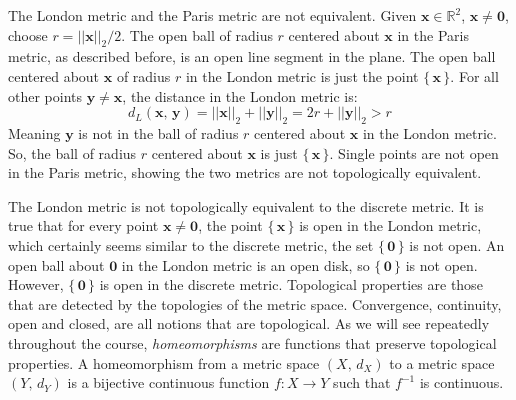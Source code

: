 \documentclass{article}
\theoremstyle{plain}
\theoremstyle{normal}
\newenvironment{example}{%
    \pushQED{\qed}\renewcommand{\qedsymbol}{$\blacksquare$}\examplex%
}{%
    \popQED\endexamplex%
}
\newenvironment{definition}{%
    \pushQED{\qed}\renewcommand{\qedsymbol}{$\blacksquare$}\definitionx%
}{%
    \popQED\enddefinitionx%
}
\begin{document}
        \begin{example}
            The London metric and the Paris metric are not equivalent. Given
            $\mathbf{x}\in\mathbb{R}^{2}$, $\mathbf{x}\ne\mathbf{0}$, choose
            $r=||\mathbf{x}||_{2}/2$. The open ball of radius $r$ centered about
            $\mathbf{x}$ in the Paris metric, as described before, is an open
            line segment in the plane. The open ball centered about
            $\mathbf{x}$ of radius $r$ in the London metric is just the
            point $\{\,\mathbf{x}\,\}$. For all other points
            $\mathbf{y}\ne\mathbf{x}$, the distance in the London metric is:
            \begin{equation}
                d_{L}(\mathbf{x},\,\mathbf{y})=
                    ||\mathbf{x}||_{2}+||\mathbf{y}||_{2}
                    =2r+||\mathbf{y}||_{2}>r
            \end{equation}
            Meaning $\mathbf{y}$ is not in the ball of radius $r$ centered about
            $\mathbf{x}$ in the London metric. So, the ball of radius $r$
            centered about $\mathbf{x}$ is just $\{\,\mathbf{x}\,\}$. Single
            points are not open in the Paris metric, showing the two metrics
            are not topologically equivalent.
        \end{example}
        \begin{example}
            The London metric is not topologically equivalent to the discrete
            metric. It is true that for every point $\mathbf{x}\ne\mathbf{0}$,
            the point $\{\,\mathbf{x}\,\}$ is open in the London metric, which
            certainly seems similar to the discrete metric, the set
            $\{\,\mathbf{0}\,\}$ is not open. An open ball about
            $\mathbf{0}$ in the London metric is an open disk, so
            $\{\,\mathbf{0}\,\}$ is not open. However, $\{\,\mathbf{0}\,\}$
            is open in the discrete metric.
        \end{example}
        Topological properties are those that are detected by the
        topologies of the metric space. Convergence, continuity, open and
        closed, are all notions that are topological. As we will see
        repeatedly throughout the course, \textit{homeomorphisms} are functions
        that preserve topological properties.
        \begin{definition}[\textbf{Homeomorphism}]
            A homeomorphism from a metric space $(X,\,d_{X})$ to a metric space
            $(Y,\,d_{Y})$ is a bijective continuous function $f:X\rightarrow{Y}$
            such that $f^{-1}$ is continuous.
        \end{definition}
\end{document}
